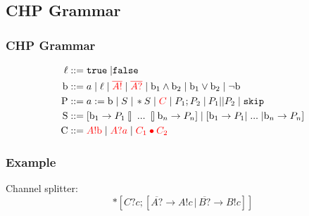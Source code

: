\documentclass[compress]{beamer}
\begin{document}
\subsection{CHP Grammar}
\begin{frame}
    \frametitle{CHP Grammar}
    \begin{align*}
        \ell & ::= \mathtt{true} \; | \mathtt{false} \\
        \mathrm{b} & ::= a \; | \; \ell \; | \; {\color{red} \overline{A!}} \; | \; {\color{red} \overline{A?}} \; | \; \mathrm{b}_1 \wedge \mathrm{b}_2 \; | \; \mathrm{b}_1 \vee \mathrm{b}_2 \; | \; \lnot \mathrm{b} \\
        \mathrm{P} & ::= a := \mathrm{b} \; | \; S \; | \, *S \; | \; {\color{red} C} \; | \; P_1; P_2 \; | \: P_1 || P_2 \; | \; \mathtt{skip} \\
        \mathrm{S} & ::= [ \mathrm{b}_1 \rightarrow P_1 \talloblong \; ... \; \talloblong \mathrm{b}_n \rightarrow P_n ] \; | \; [ \mathrm{b}_1 \rightarrow P_1 | \; ... \; | \mathrm{b}_n \rightarrow P_n ] \\
        \mathrm{C} & ::= {\color{red} A!\mathrm{b}} \; | \; {\color{red} A?a} \; | \; {\color{red} C_1 \bullet C_2}
    \end{align*}
\end{frame}

\begin{frame}
    \frametitle{Example}
    Channel splitter:
    {\small $$*[C?c; [\overline{A?} \rightarrow A!c \, | \, \overline{B?} \rightarrow B!c]]$$}
\end{frame}
\end{document}
